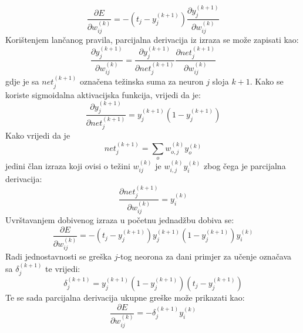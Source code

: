 \documentclass[times, utf8, zavrsni, numeric]{fer}
\begin{document}
\[
    \frac{\partial E}{\partial w_{ij}^{(k)}}
    = -(t_j - y_j^{(k + 1)})\frac{\partial y_j^{(k + 1)}}{\partial w_{ij}^{(k)}}
\]
Korištenjem lančanog pravila, parcijalna derivacija iz izraza se može zapisati kao:
\[
    \frac{\partial y_j^{(k + 1)}}{\partial w_{ij}^{(k)}}
    = \frac{\partial y_j^{(k + 1)}}{\partial net_{j}^{(k+1)}}
    \frac{\partial net_{j}^{(k+1)}}{\partial w_{ij}^{(k)}}
\]
gdje je sa $net_{j}^{(k+1)}$ označena težinska suma za neuron $j$ sloja $k+1$. Kako se koriste sigmoidalna aktivacijska funkcija, vrijedi da je:
\[
    \frac{\partial y_j^{(k + 1)}}{\partial net_{j}^{(k+1)}}
    = y_j^{(k + 1)} (1 - y_j^{(k + 1)})
\]
Kako vrijedi da je
\[
    net_{j}^{(k+1)} = \displaystyle\sum_o w_{o,j}^{(k)}y_o^{(k)}    
\]
jedini član izraza koji ovisi o težini $w_{ij}^{(k)}$ je $w_{i,j}^{(k)}y_i^{(k)}$ zbog čega je parcijalna derivacija:
\[
    \frac{\partial net_{j}^{(k+1)}}{\partial w_{ij}^{(k)}} = y_i^{(k)}
\]
Uvrštavanjem dobivenog izraza u početnu jednadžbu dobiva se:
\[
    \frac{\partial E}{\partial w_{ij}^{(k)}}
    = -(t_j - y_j^{(k + 1)})
    y_j^{(k + 1)} (1 - y_j^{(k + 1)})
    y_i^{(k)}
\]
Radi jednostavnosti se greška $j$-tog neorona za dani primjer za učenje označava sa $\delta_j^{(k+1)}$ te vrijedi:
\[
    \delta_j^{(k+1)} = y_j^{(k + 1)}(1 - y_j^{(k + 1)})(t_j - y_j^{(k + 1)})
\]
Te se sada parcijalna derivacija ukupne greške može prikazati kao:
\[
    \frac{\partial E}{\partial w_{ij}^{(k)}} = -\delta_j^{(k+1)}y_i^{(k)}
\]
\end{document}
